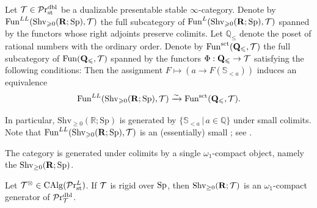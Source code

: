 \documentclass[10pt,a4paper,oneside]{article}
\begin{document}
\begin{prop}\label{efigenerator1}
Let $\mathcal{T}\in \mathcal{P}\mathrm{r}_{\operatorname{st}}^{\operatorname{dbl}}$ be a dualizable presentable stable $\infty$-category. Denote by $\operatorname{Fun}^{L L}(\operatorname{Shv}_{\geqslant 0}(\mathbf{R} ; \mathrm{Sp}), \mathcal{T})$ the full subcategory of $\operatorname{Fun}^L(\operatorname{Shv}_{\geqslant 0}(\mathbf{R} ; \mathrm{Sp}), \mathcal{T})$
spanned by the functors whose right adjoints preserve colimits. Let $\mathbb{Q}_{\leqslant}$ denote the poset of rational numbers with the ordinary order. Denote by $\operatorname{Fun}^{\operatorname{sct}}(\mathbf{Q}_{\leqslant},\mathcal{T})$ the full subcategory of $\operatorname{Fun}(\mathbf{Q}_{\leqslant},\mathcal{T})$ spanned by the functors
$\Phi: \mathbf{Q}_{\leqslant} \rightarrow \mathcal{T}$ satisfying the following conditions:
Then the assignment $F\mapsto (a\to F(\mathbb{S}_{<a}))$ induces an equivalence
\[
\operatorname{Fun}^{L L}(\operatorname{Shv}_{\geqslant 0}(\mathbf{R} ; \mathrm{Sp}), \mathcal{T})\xrightarrow{\sim}\operatorname{Fun}^{\operatorname{sct}}(\mathbf{Q}_{\leqslant},\mathcal{T}).
\]
\end{prop}

\begin{rem}
In particular, $\mathrm{Shv}_{\geqslant 0}(\mathbb{R} ; \mathrm{Sp})$ is generated by $\{\mathbb{S}_{<a}\,|\, a\in \mathbb{Q}\}$ under small colimits. Note that $\operatorname{Fun}^{L L}(\operatorname{Shv}_{\geqslant 0}(\mathbf{R} ; \mathrm{Sp}), \mathcal{T})$ is an (essentially) small \infcat; see \cite[Lemma 1.21]{ramzi2024dualizable}.
\end{rem}

\begin{thm}\label{efigenerator2}
The category \prstdbl is generated under colimits by a single $\omega_1$-compact object, namely the \infcat $\operatorname{Shv}_{\geq0}(\mathbf{R};\operatorname{Sp})$.
\end{thm}

\begin{cor}\label{cor:omega1-coherent}
Let $\mathcal{T}^\otimes\in\operatorname{CAlg}(\mathcal{P}\mathrm{r}_{\operatorname{st}}^L)$. If $\mathcal{T}$ is rigid over $\operatorname{Sp}$, then $\operatorname{Shv}_{\geq0}(\mathbf{R};\mathcal{T})$ is an $\omega_1$-compact generator of $\mathcal{P}\mathrm{r}_{\mathcal{T}}^{\operatorname{dbl}}$.
\end{cor}
\end{document}
